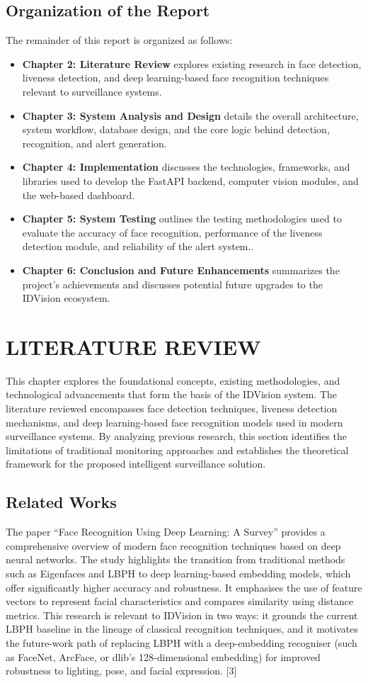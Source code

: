 \documentclass[11pt]{report}
\begin{document}
\section{Organization of the Report}
The remainder of this report is organized as follows:
\begin{itemize}
    \item \textbf{Chapter 2: Literature Review} explores existing research in face detection, liveness detection, and deep learning-based face recognition techniques relevant to surveillance systems.
    \item \textbf{Chapter 3: System Analysis and Design} details the overall architecture, system workflow, database design, and the core logic behind detection, recognition, and alert generation.
    \item \textbf{Chapter 4: Implementation} discusses the technologies, frameworks, and libraries used to develop the FastAPI backend, computer vision modules, and the web-based dashboard.
    \item \textbf{Chapter 5: System Testing} outlines the testing methodologies used to evaluate the accuracy of face recognition, performance of the liveness detection module, and reliability of the alert system..
    \item \textbf{Chapter 6: Conclusion and Future Enhancements} summarizes the project’s achievements and discusses potential future upgrades to the IDVision  ecosystem.
\end{itemize}


\chapter{LITERATURE REVIEW}  
This chapter explores the foundational concepts, existing methodologies, and technological advancements that form the basis of the IDVision system. The literature reviewed encompasses face detection techniques, liveness detection mechanisms, and deep learning-based face recognition models used in modern surveillance systems. By analyzing previous research, this section identifies the limitations of traditional monitoring approaches and establishes the theoretical framework for the proposed intelligent surveillance solution.
\section{Related Works}
The paper “Face Recognition Using Deep Learning: A Survey” provides a comprehensive overview of modern face recognition techniques based on deep neural networks. The study highlights the transition from traditional methods such as Eigenfaces and LBPH to deep learning-based embedding models, which offer significantly higher accuracy and robustness. It emphasises the use of feature vectors to represent facial characteristics and compares similarity using distance metrics. This research is relevant to IDVision in two ways: it grounds the current LBPH baseline in the lineage of classical recognition techniques, and it motivates the future-work path of replacing LBPH with a deep-embedding recogniser (such as FaceNet, ArcFace, or dlib's 128-dimensional embedding) for improved robustness to lighting, pose, and facial expression. [3]
\end{document}
